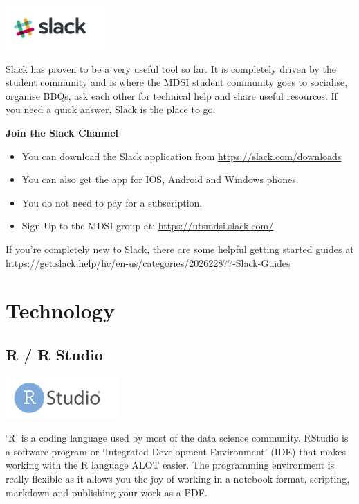 \documentclass[]{book}
\providecommand{\tightlist}{%
  \setlength{\itemsep}{0pt}\setlength{\parskip}{0pt}}
\theoremstyle{definition}
\theoremstyle{definition}
\theoremstyle{remark}
\begin{document}
\includegraphics{images/Slacklogo.png}

Slack has proven to be a very useful tool so far. It is completely
driven by the student community and is where the MDSI student community
goes to socialise, organise BBQs, ask each other for technical help and
share useful resources. If you need a quick answer, Slack is the place
to go.

\textbf{Join the Slack Channel}

\begin{itemize}
\tightlist
\item
  You can download the Slack application from
  \url{https://slack.com/downloads}
\item
  You can also get the app for IOS, Android and Windows phones.
\item
  You do not need to pay for a subscription.
\item
  Sign Up to the MDSI group at: \url{https://utsmdsi.slack.com/}
\end{itemize}

If you're completely new to Slack, there are some helpful getting
started guides at
\url{https://get.slack.help/hc/en-us/categories/202622877-Slack-Guides}

\section{Technology}\label{technology}

\subsection{R / R Studio}\label{r-r-studio}

\includegraphics{Images/RStudiologo.png}

`R' is a coding language used by most of the data science community.
RStudio is a software program or `Integrated Development Environment'
(IDE) that makes working with the R language ALOT easier. The
programming environment is really flexible as it allows you the joy of
working in a notebook format, scripting, markdown and publishing your
work as a PDF.
\end{document}
